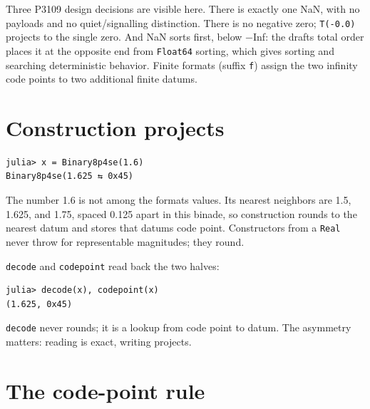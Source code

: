 Three P3109 design decisions are visible here. There is exactly one NaN, with no payloads and no quiet/signalling distinction. There is no negative zero; \texttt{T(-0.0)} projects to the single zero. And NaN sorts first, below −Inf: the draft{\textquotesingle}s total order places it at the opposite end from \texttt{Float64} sorting, which gives sorting and searching deterministic behavior. Finite formats (suffix \texttt{f}) assign the two infinity code points to two additional finite datums.



\section{Construction projects}



\label{8317558927995832252}{}



\begin{verbatim}
julia> x = Binary8p4se(1.6)
Binary8p4se(1.625 ⇆ 0x45)
\end{verbatim}



The number 1.6 is not among the format{\textquotesingle}s values. Its nearest neighbors are 1.5, 1.625, and 1.75, spaced 0.125 apart in this binade, so construction rounds to the nearest datum and stores that datum{\textquotesingle}s code point. Constructors from a \texttt{Real} never throw for representable magnitudes; they round.



\texttt{decode} and \texttt{codepoint} read back the two halves:




\nopagebreak[4]
\begin{verbatim}
julia> decode(x), codepoint(x)
(1.625, 0x45)
\end{verbatim}



\texttt{decode} never rounds; it is a lookup from code point to datum. The asymmetry matters: reading is exact, writing projects.



\section{The code-point rule}



\label{13234262959082347228}{}


